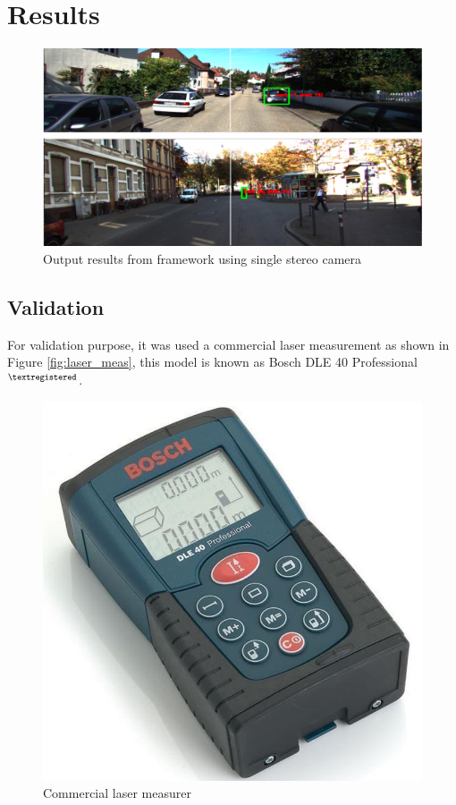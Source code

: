 \chapter{Results}
\label{capitulo5}




\begin{figure}[H]
\centering
\includegraphics[width=\textwidth]{imagens/ouput.png}
\caption{Output results from framework using single stereo camera}
\label{fig:output}
\end{figure}


\section{Validation}

For validation purpose, it was used a commercial laser measurement as shown in Figure \ref{fig:laser_meas}, this model is known as Bosch DLE 40 Professional $^{\tiny{\textregistered}}$. 



\begin{figure}[H]
\centering
\includegraphics[scale=0.3]{imagens/trena.jpg}
\caption{Commercial laser measurer}
\label{fig:output}
\end{figure}

